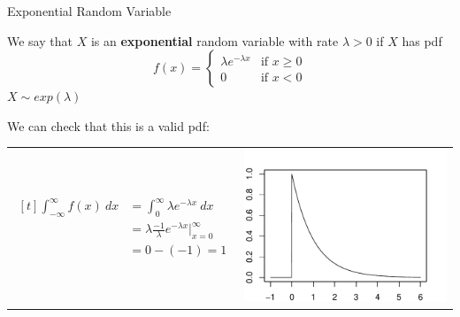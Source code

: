 \documentclass[]{beamer}
\begin{document}
\begin{frame}{Exponential Random Variable}
    \begin{block}{}
        We say that $X$ is an \textbf{exponential} random variable with rate $\lambda>0$ if $X$ has pdf
        $$f(x) = \begin{cases}\lambda e^{-\lambda x} & \text{if }x\geq 0 \\ 0 & \text{if }x<0\end{cases}$$
        $X \sim exp(\lambda)$
    \end{block}
    \pause We can check that this is a valid pdf:

    \begin{tabular}{p{5.5cm}p{4cm}}
        \vspace{0cm}
        $\begin{aligned}[t]
                \int_{-\infty}^\infty f(x)\ dx & = \int_0^\infty \lambda e^{-\lambda x}\ dx                      \\
                                               & = \lambda \frac{-1}\lambda e^{-\lambda x}\Big\vert_{x=0}^\infty \\
                                               & = 0 - (-1) = 1
            \end{aligned}$
         &
        \vspace{-.25cm}
        \includegraphics[scale=.55]{ch4_pdf_exp.pdf}
    \end{tabular}
\end{frame}
\end{document}
